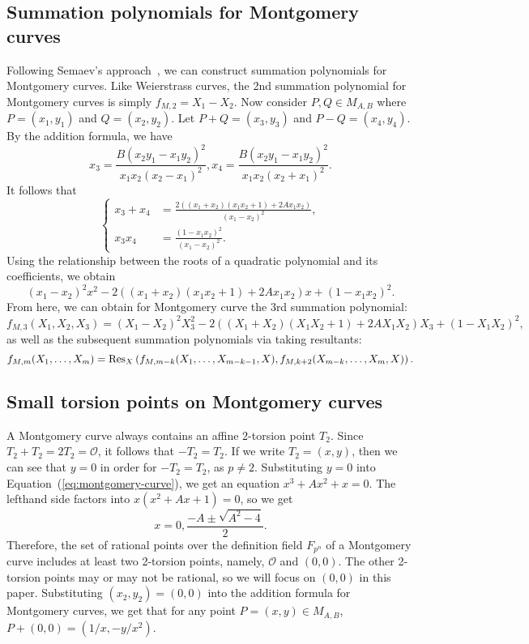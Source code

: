 \subsection{Summation polynomials for Montgomery curves}

Following Semaev's approach~\cite{DBLP:journals/iacr/Semaev04}, we can
construct summation polynomials for Montgomery curves.
%
Like Weierstrass curves, the 2nd summation polynomial for Montgomery
curves is simply $f_{M,2} = X_1 - X_2$.
%
Now consider $P,Q\in M_{A, B}$ where $P=(x_1, y_1)$ and
$Q=(x_2, y_2)$.
%
Let $P+Q=(x_3, y_3)$ and $P-Q=(x_4, y_4)$.
%
By the addition formula, we have
\[ x_3 = \frac{B(x_2y_1 - x_1y_2)^2} {x_1x_2(x_2 - x_1)^2},
  x_4 =\frac{B(x_2y_1 - x_1y_2)^2} {x_1x_2(x_2 + x_1)^2}. \]
%
It follows that
%
\[ \left\{\begin{aligned} x_3 + x_4&=\frac{2\left((x_1 + x_2)(x_1x_2 + 1) + 2Ax_1x_2\right)}{(x_1 - x_2)^2}, \\
      x_3x_4&=\frac{(1 - x_1x_2)^2}{(x_1 - x_2)^2}.
    \end{aligned}\right. \]
%
Using the relationship between the roots of a quadratic polynomial and
its coefficients, we obtain
\[ (x_1 - x_2)^2x^2 - 2\left((x_1 + x_2)(x_1x_2 + 1) +
    2Ax_1x_2\right)x + (1 - x_1x_2)^2. \]
%
From here, we can obtain for Montgomery curve the 3rd summation
polynomial:
\[ f_{M,3}(X_1,X_2,X_3) = (X_1 - X_2)^2X_3^2 - 2\left((X_1 +
    X_2)(X_1X_2 + 1) + 2AX_1X_2\right)X_3 + (1-X_1X_2)^2, \]
%
as well as the subsequent summation polynomials via taking resultants:
\[ f_{M,m}(X_1,\ldots,X_m) =
  \operatorname{Res}_X\left(f_{M,m-k}(X_1,\ldots,X_{m-k-1},X),f_{M,k+2}(X_{m-k},\ldots,X_m,X)\right). \]

  
\subsection{Small torsion points on Montgomery
  curves} \label{subsec:TSPL}
A Montgomery curve always contains an affine 2-torsion point $T_2$.
%
Since $T_2+T_2=2T_2=\mathcal O$, it follows that $-T_2=T_2$.
%
If we write $T_2=(x,y)$, then we can see that $y=0$ in order for
$-T_2=T_2$, as $p\neq 2$.
%
Substituting $y=0$ into Equation~(\ref{eq:montgomery-curve}),
we get an equation $x^3+Ax^2+x=0$.
%
The lefthand side factors into $x(x^2+Ax+1)=0$, so we get \[
  x=0,\frac{-A\pm\sqrt{A^2 - 4}}{2}. \]
%
Therefore, the set of rational points over the definition field
$F_{p^n}$ of a Montgomery curve includes at least two 2-torsion
points, namely, $\mathcal O$ and $(0,0)$.
%
The other 2-torsion points may or may not be rational, so we will
focus on $(0,0)$ in this paper.
%
Substituting $(x_2,y_2)=(0,0)$ into the addition formula for
Montgomery curves, we get that for any point $P=(x,y)\in M_{A,B}$,
$P+(0,0)=(1/x,-y/x^2)$.


